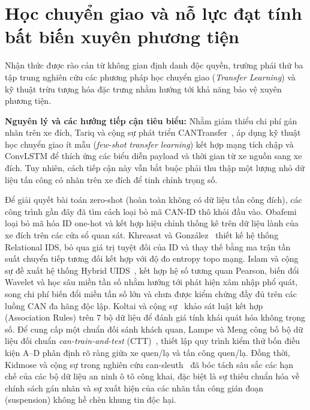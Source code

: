 \documentclass[12pt, a4paper, reqno, oneside]{book}
\begin{document}
\section{Học chuyển giao và nỗ lực đạt tính bất biến xuyên phương tiện}
Nhận thức được rào cản từ không gian định danh độc quyền, trường phái thứ ba tập trung nghiên cứu các phương pháp học chuyển giao (\textit{Transfer Learning}) và kỹ thuật trừu tượng hóa đặc trưng nhằm hướng tới khả năng bảo vệ xuyên phương tiện.

\textbf{Nguyên lý và các hướng tiếp cận tiêu biểu:}
Nhằm giảm thiểu chi phí gán nhãn trên xe đích, Tariq và cộng sự phát triển CANTransfer~\cite{tariq2020cantransfer}, áp dụng kỹ thuật học chuyển giao ít mẫu (\textit{few-shot transfer learning}) kết hợp mạng tích chập và ConvLSTM để thích ứng các biểu diễn payload và thời gian từ xe nguồn sang xe đích. Tuy nhiên, cách tiếp cận này vẫn bắt buộc phải thu thập một lượng nhỏ dữ liệu tấn công có nhãn trên xe đích để tinh chỉnh trọng số.

Để giải quyết bài toán zero-shot (hoàn toàn không có dữ liệu tấn công đích), các công trình gần đây đã tìm cách loại bỏ mã CAN-ID thô khỏi đầu vào. Obafemi~\cite{obafemi2026travel} loại bỏ mã hóa ID one-hot và kết hợp hiệu chỉnh thống kê trên dữ liệu lành của xe đích trên các cửa sổ quan sát. Khreasat và González~\cite{khreasat2026relational} thiết kế hệ thống Relational IDS, bỏ qua giá trị tuyệt đối của ID và thay thế bằng ma trận tần suất chuyển tiếp tương đối kết hợp với độ đo entropy topo mạng. Islam và cộng sự đề xuất hệ thống Hybrid UIDS~\cite{s26051489}, kết hợp hệ số tương quan Pearson, biến đổi Wavelet và học sâu miền tần số nhằm hướng tới phát hiện xâm nhập phổ quát, song chi phí biến đổi miền tần số lớn và chưa được kiểm chứng đầy đủ trên các luồng CAN đa hãng độc lập. Koltai và cộng sự~\cite{koltai2026trust} khảo sát luật kết hợp (Association Rules) trên 7 bộ dữ liệu để đánh giá tính khái quát hóa không trọng số. Để cung cấp một chuẩn đối sánh khách quan, Lampe và Meng công bố bộ dữ liệu đối chuẩn \textit{can-train-and-test} (CTT)~\cite{lampe2024curated}, thiết lập quy trình kiểm thử bốn điều kiện A--D phân định rõ ràng giữa xe quen/lạ và tấn công quen/lạ. Đồng thời, Kidmose và cộng sự trong nghiên cứu can-sleuth~\cite{kidmose2025cansleuth} đã bóc tách sâu sắc các hạn chế của các bộ dữ liệu an ninh ô tô công khai, đặc biệt là sự thiếu chuẩn hóa về chính sách gán nhãn và sự xuất hiện của các nhãn tấn công gián đoạn (suspension) không hề chèn khung tin độc hại.
\end{document}
